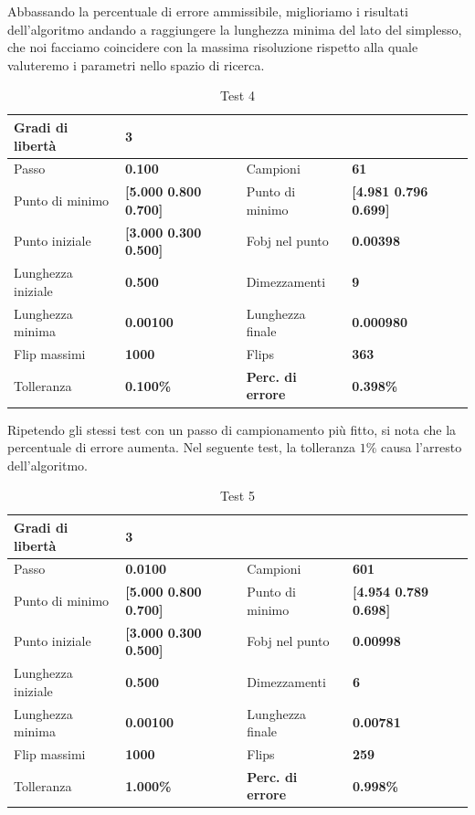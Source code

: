 \documentclass[a4paper, 11pt]{article}
\begin{document}
\noindent
Abbassando la percentuale di errore ammissibile, miglioriamo i risultati
dell'algoritmo andando a raggiungere la lunghezza minima del lato del simplesso,
che noi facciamo coincidere con la massima risoluzione rispetto alla quale
valuteremo i parametri nello spazio di ricerca.

\begin{table}[h] 
	\caption{Test 4}
	\begin{center}
	\begin{tabular}{|l|l|l|l|} 
	\hline 
	Gradi di libertà & \textbf{3} &  &  \\ \hline 
	Passo & \textbf{0.100} & Campioni & \textbf{61} \\ \hline 
	Punto di minimo & \textbf{{[}5.000 0.800 0.700{]}} & Punto di minimo & \textbf{{[}4.981 0.796 0.699{]}} \\ \hline 
	Punto iniziale & \textbf{{[}3.000 0.300 0.500{]}} & Fobj nel punto & \textbf{0.00398} \\ \hline 
	Lunghezza iniziale & \textbf{0.500} & Dimezzamenti & \textbf{9} \\ \hline 
	Lunghezza minima & \textbf{0.00100} & Lunghezza finale & \textbf{0.000980} \\ \hline
	Flip massimi & \textbf{1000} & Flips & \textbf{363} \\ \hline 
	Tolleranza & \textbf{0.100\%} & \textbf{Perc. di errore} & \textbf{0.398\%} \\ \hline 
	\end{tabular} 
	\end{center}
	\end{table}

\noindent
Ripetendo gli stessi test con un passo di campionamento più fitto, si nota che
la percentuale di errore aumenta. Nel seguente test, la tolleranza $1\%$ causa
l'arresto dell'algoritmo.

\begin{table}[h] 
	\caption{Test 5}
	\begin{center}
	\begin{tabular}{|l|l|l|l|} 
	\hline 
	Gradi di libertà & \textbf{3} &  &  \\ \hline 
	Passo & \textbf{0.0100} & Campioni & \textbf{601} \\ \hline 
	Punto di minimo & \textbf{{[}5.000 0.800 0.700{]}} & Punto di minimo & \textbf{{[}4.954 0.789 0.698{]}} \\ \hline 
	Punto iniziale & \textbf{{[}3.000 0.300 0.500{]}} & Fobj nel punto & \textbf{0.00998} \\ \hline 
	Lunghezza iniziale & \textbf{0.500} & Dimezzamenti & \textbf{6} \\ \hline 
	Lunghezza minima & \textbf{0.00100} & Lunghezza finale & \textbf{0.00781} \\ \hline
	Flip massimi & \textbf{1000} & Flips & \textbf{259} \\ \hline 
	Tolleranza & \textbf{1.000\%} & \textbf{Perc. di errore} & \textbf{0.998\%} \\ \hline 
	\end{tabular} 
	\end{center}
	\end{table}
\end{document}
